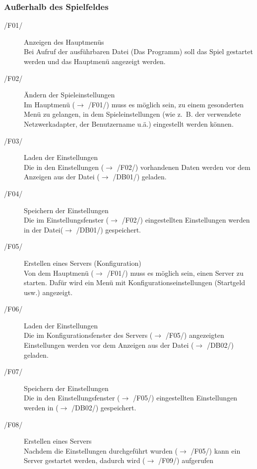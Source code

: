 \documentclass[a4paper,10pt]{article}
\begin{document}
\subsubsection{Außerhalb des Spielfeldes}
\begin{description}
\item[/F01/] Anzeigen des Hauptmenüs \\
Bei Aufruf der ausführbaren Datei (Das Programm) soll das Spiel gestartet werden und das Hauptmenü angezeigt werden.

\item[/F02/] Ändern der Spieleinstellungen \\
Im Hauptmenü ($\rightarrow$ /F01/) muss es möglich sein, zu einem gesonderten Menü zu gelangen, in dem Spieleinstellungen (wie z.~B. der verwendete Netzwerkadapter, der Benutzername u.ä.) eingestellt werden können.

\item[/F03/] Laden der Einstellungen \\
Die in den Einstellungen ($\rightarrow$ /F02/) vorhandenen Daten werden vor dem Anzeigen aus der Datei ($\rightarrow$ /DB01/) geladen.

\item[/F04/] Speichern der Einstellungen \\
Die im Einstellungsfenster ($\rightarrow$ /F02/) eingestellten Einstellungen werden in der Datei($\rightarrow$ /DB01/) gespeichert.

\item[/F05/] Erstellen eines Servers (Konfiguration) \\
Von dem Hauptmenü ($\rightarrow$ /F01/) muss es möglich sein, einen Server zu starten. Dafür wird ein Menü mit Konfigurationseinstellungen (Startgeld usw.) angezeigt.

\item[/F06/] Laden der Einstellungen \\
Die im Konfigurationsfenster des Servers ($\rightarrow$ /F05/) angezeigten Einstellungen werden vor dem Anzeigen aus der Datei ($\rightarrow$ /DB02/) geladen.

\item[/F07/] Speichern der Einstellungen \\
Die in den Einstellungsfenster ($\rightarrow$ /F05/) eingestellten Einstellungen werden in ($\rightarrow$ /DB02/) gespeichert.

\item[/F08/] Erstellen eines Servers \\
Nachdem die Einstellungen durchgeführt wurden ($\rightarrow$ /F05/) kann ein Server gestartet werden, dadurch wird ($\rightarrow$ /F09/) aufgerufen


\end{description}
\end{document}
